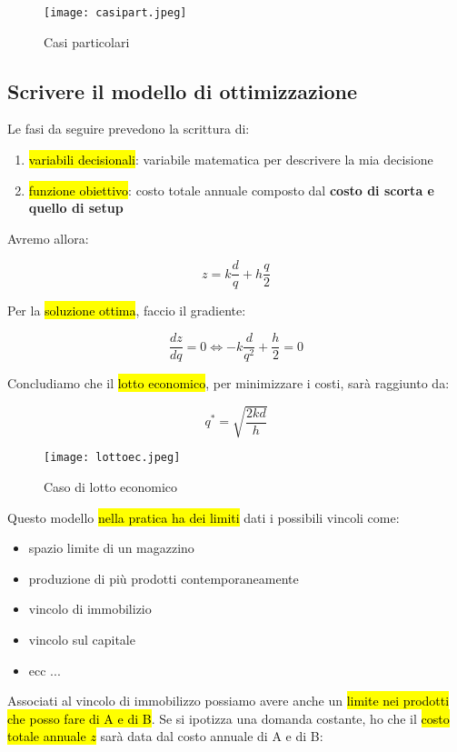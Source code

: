 \begin{figure}[H]
\centering
\texttt{[image: casipart.jpeg]}
\caption{Casi particolari} 
\label{casipart}
\end{figure}


\subsection{Scrivere il modello di ottimizzazione}

Le fasi da seguire prevedono la scrittura di:

\begin{enumerate}
	\item \hl{variabili decisionali}: variabile matematica per descrivere la mia decisione
	\item \hl{funzione obiettivo}: costo totale annuale composto dal \textbf{costo di scorta e quello di setup}
\end{enumerate}

Avremo allora:

$$z = k \frac{d}{q} + h \frac{q}{2} $$


Per la \hl{soluzione ottima}, faccio il gradiente:

$$\frac{dz}{dq} = 0 \Leftrightarrow -k \frac{d}{q^2} + \frac{h}{2} = 0$$


Concludiamo che il \hl{lotto economico}, per minimizzare i costi, sarà raggiunto da:

$$q^* = \sqrt{\frac{2kd}{h}}$$


\begin{figure}[H]
\centering
\texttt{[image: lottoec.jpeg]}
\caption{Caso di lotto economico} 
\label{lottoec}
\end{figure}



Questo modello \hl{nella pratica ha dei limiti} dati i possibili vincoli come:

\begin{itemize}
	\item spazio limite di un magazzino
	\item produzione di più prodotti contemporaneamente
	\item vincolo di immobilizio
	\item vincolo sul capitale
	\item ecc ...
\end{itemize}


Associati al vincolo di immobilizzo possiamo avere anche un \hl{limite nei prodotti che posso fare di A e di B}. Se si ipotizza una domanda costante, ho che il \hl{costo totale annuale $z$} sarà data dal costo annuale di A e di B:

